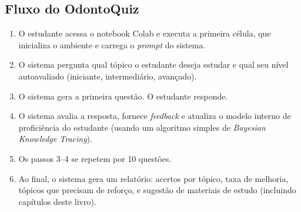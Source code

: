 \subsection{Fluxo do OdontoQuiz}

\begin{enumerate}
  \item O estudante acessa o notebook Colab e executa a primeira célula, que
    inicializa o ambiente e carrega o \textit{prompt} do sistema.

  \item O sistema pergunta qual tópico o estudante deseja estudar e qual seu
    nível autoavaliado (iniciante, intermediário, avançado).

  \item O sistema gera a primeira questão. O estudante responde.

  \item O sistema avalia a resposta, fornece \textit{feedback} e atualiza o
    modelo interno de proficiência do estudante (usando um algoritmo simples
    de \textit{Bayesian Knowledge Tracing}).

  \item Os passos 3--4 se repetem por 10 questões.

  \item Ao final, o sistema gera um relatório: acertos por tópico, taxa de
    melhoria, tópicos que precisam de reforço, e sugestão de materiais de
    estudo (incluindo capítulos deste livro).
\end{enumerate}

